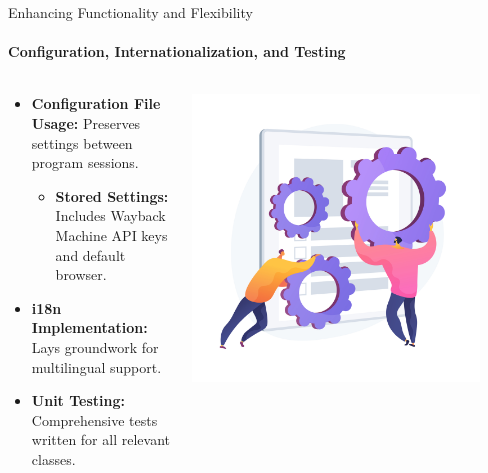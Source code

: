 \documentclass[
    ngerman,%
    authorontitle=true,
]{bfhbeamer}
\begin{document}
	\begin{frame}{Enhancing Functionality and Flexibility}
		\framesubtitle{Configuration, Internationalization, and Testing}
		\begin{columns} %
			\begin{column}{0.6\textwidth} %
				\begin{itemize}
					\item \textbf{Configuration File Usage:} Preserves settings between program sessions.
					\begin{itemize}
						\item \textbf{Stored Settings:} Includes Wayback Machine API keys and default browser.
					\end{itemize}
					\item \textbf{i18n Implementation:} Lays groundwork for multilingual support.
					\item \textbf{Unit Testing:} Comprehensive tests written for all relevant classes.
				\end{itemize}
			\end{column}
			\begin{column}{0.4\textwidth} %
				\begin{center}
					\includegraphics[width=0.9\textwidth]{pictures/final_presentation/functionality.jpg}
				\end{center}
			\end{column}
		\end{columns} %
	\end{frame}
\end{document}

